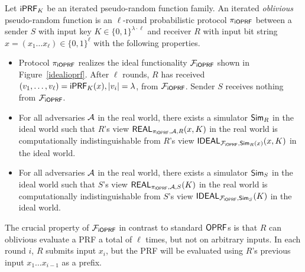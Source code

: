 \begin{definition}[$\proto$]
  Let $\mathsf{i}\mathsf{PRF}_K$ be an iterated pseudo-random function family.  An
  iterated \emph{oblivious} pseudo-random function is an $\ell$-round
  probabilistic protocol $\proto$ between a sender $S$ with input key
  $K\in\{0,1\}^{\lambda\cdot\ell}$ and receiver $R$ with input bit
  string $x=(x_1\ldots{}x_\ell)\in\{0,1\}^{\ell}$ with the following
  properties.

  \begin{itemize}
   
  \item Protocol $\proto$ realizes the ideal functionality $\mathcal{F}_{\mathsf{i}\mathsf{OPRF}}$
    shown in Figure~\ref{idealioprf}. After $\ell$ rounds, $R$ has
    received $(v_1,\ldots,v_\ell)=\mathsf{i}\mathsf{PRF}_K(x),|v_i|=\lambda$, from
    $\mathcal{F}_{\mathsf{i}\mathsf{OPRF}}$. Sender $S$ receives nothing from $\mathcal{F}_{\mathsf{i}\mathsf{OPRF}}$.
  
  \item For all adversaries ${\mathcal{A}}$ in the real world, there exists a
    simulator ${\mathsf{Sim}}_R$ in the ideal world such that $R$'s view
    $\mathsf{REAL}_{{\pi_{\mathsf{i}\mathsf{OPRF}}},{\mathcal{A}},R}(x,K)$ in the real world is
    computationally indistinguishable from $R$'s view
    $\mathsf{IDEAL}_{\mathcal{F}_{\mathsf{i}\mathsf{OPRF}},{\mathsf{Sim}}_R(x)}(x,K)$ in the ideal world.

  \item For all adversaries ${\mathcal{A}}$ in the real world, there exists a
    simulator ${\mathsf{Sim}}_S$ in the ideal world such that $S$'s view
    $\mathsf{REAL}_{{\pi_{\mathsf{i}\mathsf{OPRF}}},{\mathcal{A}},S}(K)$ in the real world is
    computationally indistinguishable from $S$'s view
    $\mathsf{IDEAL}_{\mathcal{F}_{\mathsf{i}\mathsf{OPRF}},{\mathsf{Sim}}_S}(K)$ in the ideal world.
\end{itemize}
\end{definition}

The crucial property of $\mathcal{F}_{\mathsf{i}\mathsf{OPRF}}$ in contrast to standard $\mathsf{OPRF}$s is
that $R$ can oblivious evaluate a PRF a total of $\ell$ times, but not
on arbitrary inputs. In each round $i$, $R$ submits input $x_i$, but
the PRF will be evaluated using $R$'s previous input
$x_1\ldots{}x_{i-1}$ as a prefix.

